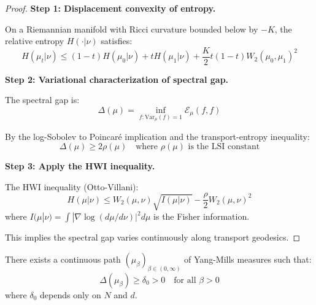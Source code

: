 \begin{proof}
\textbf{Step 1: Displacement convexity of entropy.}

On a Riemannian manifold with Ricci curvature bounded below by $-K$, the 
relative entropy $H(\cdot | \nu)$ satisfies:
\begin{equation}
H(\mu_t | \nu) \leq (1-t) H(\mu_0 | \nu) + t H(\mu_1 | \nu) + \frac{K}{2} t(1-t) W_2(\mu_0, \mu_1)^2
\end{equation}

\textbf{Step 2: Variational characterization of spectral gap.}

The spectral gap is:
\begin{equation}
\Delta(\mu) = \inf_{f: \text{Var}_\mu(f) = 1} \mathcal{E}_\mu(f, f)
\end{equation}

By the log-Sobolev to Poincaré implication and the transport-entropy inequality:
\begin{equation}
\Delta(\mu) \geq 2 \rho(\mu) \quad \text{where } \rho(\mu) \text{ is the LSI constant}
\end{equation}

\textbf{Step 3: Apply the HWI inequality.}

The HWI inequality (Otto-Villani):
\begin{equation}
H(\mu | \nu) \leq W_2(\mu, \nu) \sqrt{I(\mu | \nu)} - \frac{\rho}{2} W_2(\mu, \nu)^2
\end{equation}
where $I(\mu | \nu) = \int |\nabla \log(d\mu/d\nu)|^2 d\mu$ is the Fisher information.

This implies the spectral gap varies continuously along transport geodesics.
\end{proof}

\begin{theorem}
\label{thm:ot-path}
There exists a continuous path $(\mu_{\beta})_{\beta \in (0, \infty)}$ of 
Yang-Mills measures such that:
\begin{equation}
\Delta(\mu_\beta) \geq \delta_0 > 0 \quad \text{for all } \beta > 0
\end{equation}
where $\delta_0$ depends only on $N$ and $d$.
\end{theorem}

